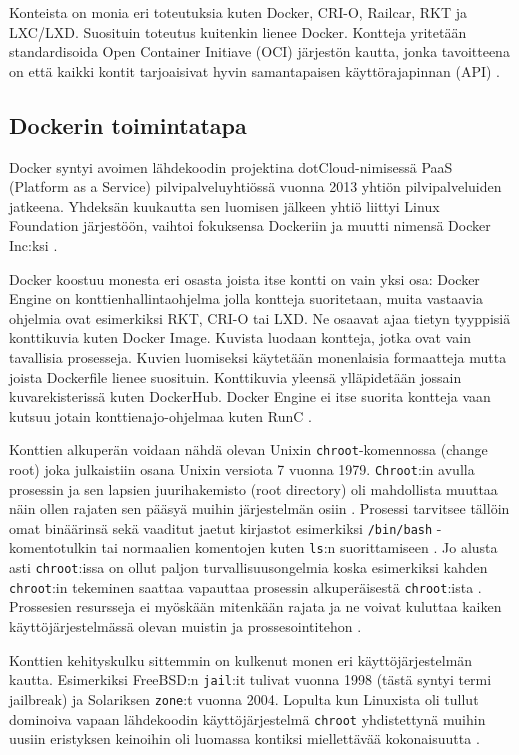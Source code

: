 \documentclass[finnish]{tktltiki2}
\theoremstyle{definition}
\theoremstyle{remark}
\begin{document}
Konteista on monia eri toteutuksia kuten Docker, CRI-O, Railcar, RKT ja LXC/LXD. Suosituin toteutus kuitenkin lienee Docker. Kontteja yritetään standardisoida Open Container Initiave (OCI) järjestön kautta, jonka tavoitteena on että kaikki kontit tarjoaisivat hyvin samantapaisen käyttörajapinnan (API) \cite{practical-container}.

\subsection{Dockerin toimintatapa}

Docker syntyi avoimen lähdekoodin projektina dotCloud-nimisessä PaaS (Platform as a Service) pilvipalveluyhtiössä vuonna 2013 yhtiön pilvipalveluiden jatkeena. Yhdeksän kuukautta sen luomisen jälkeen yhtiö liittyi Linux Foundation järjestöön, vaihtoi fokuksensa Dockeriin ja muutti nimensä Docker Inc:ksi \cite{docker}.

Docker koostuu monesta eri osasta joista itse kontti on vain yksi osa: Docker Engine on konttienhallintaohjelma jolla kontteja suoritetaan, muita vastaavia ohjelmia ovat esimerkiksi RKT, CRI-O tai LXD. Ne osaavat ajaa tietyn tyyppisiä konttikuvia kuten Docker Image. Kuvista luodaan kontteja, jotka ovat vain tavallisia prosesseja. Kuvien luomiseksi käytetään monenlaisia formaatteja mutta joista Dockerfile lienee suosituin. Konttikuvia yleensä ylläpidetään jossain kuvarekisterissä kuten DockerHub. Docker Engine ei itse suorita kontteja vaan kutsuu jotain konttienajo-ohjelmaa kuten RunC \cite{practical-container}.

Konttien alkuperän voidaan nähdä olevan Unixin \texttt{chroot}-komennossa (change root) joka julkaistiin osana Unixin versiota 7 vuonna 1979. \texttt{Chroot}:in avulla prosessin ja sen lapsien juurihakemisto (root directory) oli mahdollista muuttaa näin ollen rajaten sen pääsyä muihin järjestelmän osiin \cite{containers-in-multi-user-environments}. Prosessi tarvitsee tällöin omat binäärinsä sekä vaaditut jaetut kirjastot esimerkiksi \texttt{/bin/bash} -komentotulkin tai normaalien komentojen kuten \texttt{ls}:n suorittamiseen \cite{oracle-docs-chroot}. Jo alusta asti \texttt{chroot}:issa on ollut paljon turvallisuusongelmia koska esimerkiksi kahden \texttt{chroot}:in tekeminen saattaa vapauttaa prosessin alkuperäisestä \texttt{chroot}:ista \cite{chroot-paper}. Prossesien resursseja ei myöskään mitenkään rajata ja ne voivat kuluttaa kaiken käyttöjärjestelmässä olevan muistin ja prossesointitehon \cite{chroot-blog}.

Konttien kehityskulku sittemmin on kulkenut monen eri käyttöjärjestelmän kautta. Esimerkiksi FreeBSD:n \texttt{jail}:it tulivat vuonna 1998 (tästä syntyi termi jailbreak) ja Solariksen \texttt{zone}:t vuonna 2004. Lopulta kun Linuxista oli tullut dominoiva vapaan lähdekoodin käyttöjärjestelmä \texttt{chroot} yhdistettynä muihin uusiin eristyksen keinoihin oli luomassa kontiksi miellettävää kokonaisuutta \cite{lxc-docker-kubernetes}.
\end{document}
